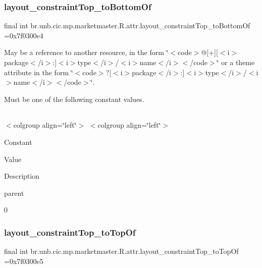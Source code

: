 \subsubsection{\texorpdfstring{layout\+\_\+constraint\+Top\+\_\+to\+Bottom\+Of}{layout\_constraintTop\_toBottomOf}}
{\footnotesize\ttfamily final int br.\+unb.\+cic.\+mp.\+marketmaster.\+R.\+attr.\+layout\+\_\+constraint\+Top\+\_\+to\+Bottom\+Of =0x7f0300e4\hspace{0.3cm}{\ttfamily [static]}}

May be a reference to another resource, in the form \char`\"{}$<$code$>$@\mbox{[}+\mbox{]}\mbox{[}$<$i$>$package$<$/i$>$\+:\mbox{]}$<$i$>$type$<$/i$>$/$<$i$>$name$<$/i$>$$<$/code$>$\char`\"{} or a theme attribute in the form \char`\"{}$<$code$>$?\mbox{[}$<$i$>$package$<$/i$>$\+:\mbox{]}$<$i$>$type$<$/i$>$/$<$i$>$name$<$/i$>$$<$/code$>$\char`\"{}. 

Must be one of the following constant values.

\tabulinesep=1mm
\begin{longtabu} spread 0pt [c]{*{0}{|X[-1]}|}
\hline
\end{longtabu}
$<$colgroup align=\char`\"{}left\char`\"{}$>$ $<$colgroup align=\char`\"{}left\char`\"{}$>$ 

Constant

Value

Description 

parent

0\mbox{\label{classbr_1_1unb_1_1cic_1_1mp_1_1marketmaster_1_1R_1_1attr_ab6aab9ccaa4d97fbe0da838e5e0a1c28}} 
\subsubsection{\texorpdfstring{layout\+\_\+constraint\+Top\+\_\+to\+Top\+Of}{layout\_constraintTop\_toTopOf}}
{\footnotesize\ttfamily final int br.\+unb.\+cic.\+mp.\+marketmaster.\+R.\+attr.\+layout\+\_\+constraint\+Top\+\_\+to\+Top\+Of =0x7f0300e5\hspace{0.3cm}{\ttfamily [static]}}

